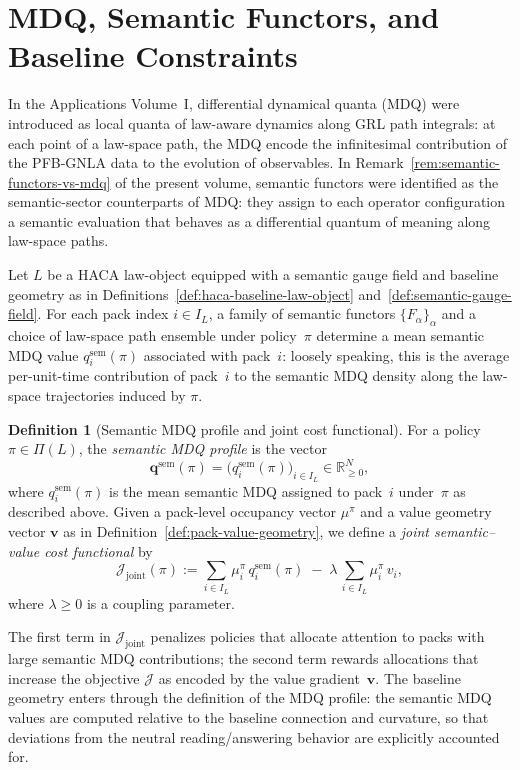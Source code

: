 \documentclass[11pt]{book}
\theoremstyle{plain}
\theoremstyle{definition}
\newtheorem{definition}[theorem]{Definition}
\theoremstyle{remark}
\begin{document}
\section[MDQ, Semantic Functors, and Baseline Constraints]{MDQ, Semantic Functors, and Baseline Constraints}


In the Applications Volume~I, differential dynamical quanta (MDQ)
were introduced as local quanta of law-aware dynamics along GRL path
integrals: at each point of a law-space path, the MDQ encode the
infinitesimal contribution of the PFB-GNLA data to the evolution of
observables. In Remark~\ref{rem:semantic-functors-vs-mdq} of the
present volume, semantic functors were identified as the semantic-sector
counterparts of MDQ: they assign to each operator configuration a
semantic evaluation that behaves as a differential quantum of meaning
along law-space paths.

Let $L$ be a HACA law-object equipped with a semantic gauge field and
baseline geometry as in
Definitions~\ref{def:haca-baseline-law-object}
and~\ref{def:semantic-gauge-field}. For each pack index $i\in I_L$,
a family of semantic functors $\{F_\alpha\}_\alpha$ and a choice of
law-space path ensemble under policy~$\pi$ determine a mean semantic MDQ
value $q_i^{\mathrm{sem}}(\pi)$ associated with pack~$i$: loosely
speaking, this is the average per-unit-time contribution of pack~$i$ to
the semantic MDQ density along the law-space trajectories induced by
$\pi$.

\begin{definition}[Semantic MDQ profile and joint cost functional]
\label{def:semantic-mdq-profile}
For a policy $\pi\in\Pi(L)$, the \emph{semantic MDQ profile} is the
vector
\[
  \mathbf{q}^{\mathrm{sem}}(\pi)
  =
  \bigl(q_i^{\mathrm{sem}}(\pi)\bigr)_{i\in I_L}
  \in\mathbb{R}_{\ge 0}^N,
\]
where $q_i^{\mathrm{sem}}(\pi)$ is the mean semantic MDQ assigned to
pack~$i$ under~$\pi$ as described above. Given a pack-level occupancy
vector $\mu^\pi$ and a value geometry vector $\mathbf{v}$ as in
Definition~\ref{def:pack-value-geometry}, we define a
\emph{joint semantic–value cost functional} by
\[
  \mathcal{J}_{\mathrm{joint}}(\pi)
  :=
  \sum_{i\in I_L}
    \mu_i^\pi\,q_i^{\mathrm{sem}}(\pi)
  \;-\;
  \lambda\,\sum_{i\in I_L}\mu_i^\pi\,v_i,
\]
where $\lambda\ge 0$ is a coupling parameter.
\end{definition}

The first term in $\mathcal{J}_{\mathrm{joint}}$ penalizes policies
that allocate attention to packs with large semantic MDQ contributions;
the second term rewards allocations that increase the objective
$\mathcal{J}$ as encoded by the value gradient~$\mathbf{v}$. The
baseline geometry enters through the definition of the MDQ profile: the
semantic MDQ values are computed relative to the baseline connection
and curvature, so that deviations from the neutral reading/answering
behavior are explicitly accounted for.
\end{document}
